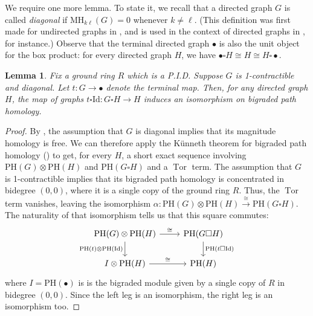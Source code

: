 \documentclass[a4paper, 11 pt, oneside, reqno]{amsart}
\newtheorem{lemma}{Lemma}
\numberwithin{lemma}{section}
\theoremstyle{definition}
\newcommand{\xto}{\xrightarrow}
\DeclareMathOperator{\tor}{Tor}
\newcommand{\MH}{\mathrm{MH}}
\newcommand{\PH}{\mathrm{PH}}
\begin{document}
We require one more lemma. To state it, we recall that a directed graph \(G\) is called \emph{diagonal} if \(\MH_{k\ell}(G) = 0\) whenever \(k \neq \ell\). (This definition was first made for undirected graphs in \cite{HepworthWillerton2017}, and is used in the context of directed graphs in \cite{Asao-path}, for instance.) Observe that the terminal directed graph \(\bullet\) is also the unit object for the box product: for every directed graph \(H\), we have \(\bullet \square H \cong H \cong H \square \bullet\).

\begin{lemma}
\label{lem:contractible_kunneth}
    Fix a ground ring \(R\) which is a P.I.D. Suppose \(G\) is 1-contractible and diagonal. Let \(t\colon G \to \bullet\) denote the terminal map. Then, for any directed graph \(H\), the map of graphs \(t \square \mathrm{Id}\colon G \square H \to H\) induces an isomorphism on bigraded path homology.
\end{lemma}

\begin{proof}
    By , the assumption that \(G\) is diagonal implies that its magnitude homology is free. We can therefore apply the K\"unneth theorem for bigraded path homology () to get, for every \(H\), a short exact sequence involving \(\PH(G) \otimes \PH(H)\) and \(\PH(G \square H)\) and a \(\tor\) term. The assumption that \(G\) is 1-contractible implies that its bigraded path homology is concentrated in bidegree \((0,0)\), where it is a single copy of the ground ring \(R\). Thus, the \(\tor\) term vanishes, leaving the isomorphism \(\alpha\colon \PH(G) \otimes \PH(H) \xto{\cong} \PH(G \square H)\). 
    The naturality of that isomorphism tells us that this square commutes:
    \[
    \begin{tikzcd}
      \PH(G) \otimes \PH(H) \arrow{r}{\cong} \arrow[swap]{d}{\PH(t) \otimes \PH(\mathrm{Id})} & \PH(G \square H) \arrow{d}{\PH(t \square \mathrm{Id})} \\
      I \otimes \PH(H) \arrow{r}{\cong} & \PH(H)
    \end{tikzcd}
    \]
    where \(I = \PH(\bullet)\) is is the bigraded module given by a single copy of \(R\) in bidegree \((0,0)\). Since the left leg is an isomorphism, the right leg is an isomorphism too.
\end{proof}
\end{document}
